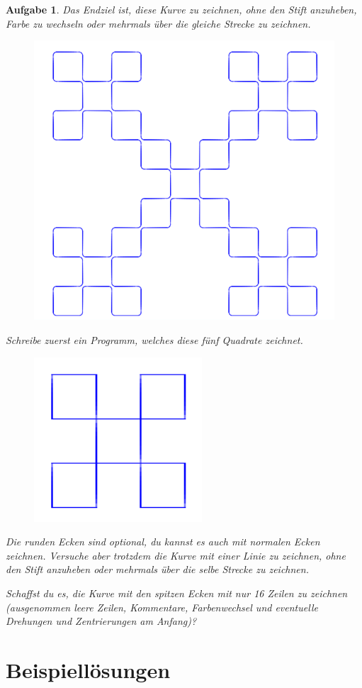 \documentclass{article}
\newtheorem{aufgabe}{Aufgabe}[section]
\begin{document}
\begin{aufgabe} \label{anticross-stitch-curve}
Das Endziel ist, diese Kurve zu zeichnen, ohne den Stift anzuheben, Farbe zu wechseln oder mehrmals über die gleiche Strecke zu zeichnen.
\begin{figure}[H]
\centering
\includegraphics[width=0.6\linewidth]{pictures/anticross-stitch-curve2-round-corners.png}
\end{figure}
Schreibe zuerst ein Programm, welches diese fünf Quadrate zeichnet.
\begin{figure}[H]
\centering
\includegraphics[width=0.3\linewidth]{pictures/anticross-stitch-curve1.png}
\end{figure}
Die runden Ecken sind optional, du kannst es auch mit normalen Ecken zeichnen. Versuche aber trotzdem die Kurve mit einer Linie zu zeichnen, ohne den Stift anzuheben oder mehrmals über die selbe Strecke zu zeichnen.

Schaffst du es, die Kurve mit den spitzen Ecken mit nur 16 Zeilen zu zeichnen (ausgenommen leere Zeilen, Kommentare, Farbenwechsel und eventuelle Drehungen und Zentrierungen am Anfang)?
\end{aufgabe}



\newpage

\section*{Beispiellösungen}
\end{document}
